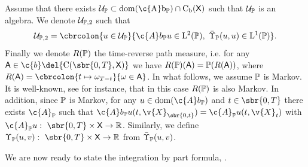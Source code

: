 Assume that there exists \(\mathcal{U}_{\bb{P}} \subset \rm{dom}(\c{A}b_{\bb{P}}) \cap \mathrm{C}_b(\sf{X})\) such that \(\mathcal{U}_{\bb{P}}\) is an algebra.
We denote \(\mathcal{U}_{\bb{P},2}\) such that \begin{equation} \mathcal{U}_{\bb{P},2} = \cbrcolon{u \in \mathcal{U}_{\bb{P}}}{\c{A}b_{\bb{P}} u \in \mathrm{L}^2(\bb{P}), \ \bar{\carrechamp}_{\bb{P}}(u,u) \in \mathrm{L}^1(\bb{P})} .
\end{equation}
Finally we denote \(R(\bb{P})\) the time-reverse path measure, i.e. for any \(\mathsf{A} \in \c{b}\del{\mathrm{C}(\sbr{0,T}, \sf{X})}\) we have \(R(\bb{P})(\mathsf{A}) = \bb{P}(R(\mathsf{A}))\), where \(R(\mathsf{A}) = \cbrcolon{t \mapsto \omega_{T-t}}{\omega \in \mathsf{A}}\).
In what follows, we assume \(\bb{P}\) is Markov.
It is well-known, see \parencite[Theorem 1.2]{leonard2014reciprocal} for instance, that in this case \(R(\bb{P})\) is also Markov.
In addition, since \(\bb{P}\) is Markov, for any \(u \in \mathrm{dom}(\c{A}b_{\bb{P}})\) and \(t \in \sbr{0,T}\) there exists \(\c{A}_{\bb{P}}\) such that \(\c{A}b_{\bb{P}} u(t, \v{X}_{\sbr{0,t}}) = \c{A}_{\bb{P}} u(t, \v{X}_t)\) with \(\c{A}_{\bb{P}} u: \ \sbr{0,T} \times \sf{X} \to \R\).
Similarly, we define \(\carrechamp_{\bb{P}}(u,v): \ \sbr{0,T} \times \sf{X} \to \R\) from \(\bar{\carrechamp}_{\bb{P}}(u,v)\).

We are now ready to state the integration by part formula, \parencite[Theorem 3.17]{cattiaux2021time}.

